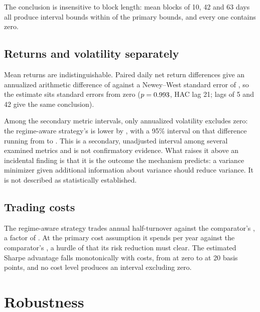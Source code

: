 The conclusion is insensitive to block length: mean blocks of 10, 42 and
63 days all produce interval bounds within \blockMaxDeviation{} of the
primary bounds, and every one contains zero.

\subsection{Returns and volatility separately}

Mean returns are indistinguishable. Paired daily net return differences
give an annualized arithmetic difference of \hacAnnualReturnDiff{}
against a Newey--West standard error of \hacStandardError{}, so the
estimate sits \hacSdsFromZero{} standard errors from zero
($p = 0.993{}$, HAC lag 21; lags of 5 and 42 give the same
conclusion).

Among the \nSecondaryMetrics{} secondary metric intervals, only
annualized volatility excludes zero: the regime-aware strategy's is
lower by \volDifferenceMagnitude{}, with a 95\% interval on that
difference running from \volCiLower{} to \volCiUpper{}. This is a secondary, unadjusted interval among several examined
metrics and is not confirmatory evidence. What raises it above an
incidental finding is that it is the outcome the mechanism predicts: a
variance minimizer given additional information about variance should
reduce variance. It is not described as statistically established.

\subsection{Trading costs}

The regime-aware strategy trades \regimeHalfTurnover{} annual
half-turnover against the comparator's \comparatorHalfTurnover{}, a
factor of \turnoverRatio{}. At the primary cost assumption it spends
\regimeCost{} per year against the comparator's \comparatorCost{}, a
hurdle of \costHurdle{} that its risk reduction must clear. The estimated
Sharpe advantage falls monotonically with costs, from \diffAtZeroBps{} at
zero to \diffAtTwentyBps{} at 20 basis points, and no cost level produces
an interval excluding zero.



\section{Robustness}
\label{sec:robustness}


